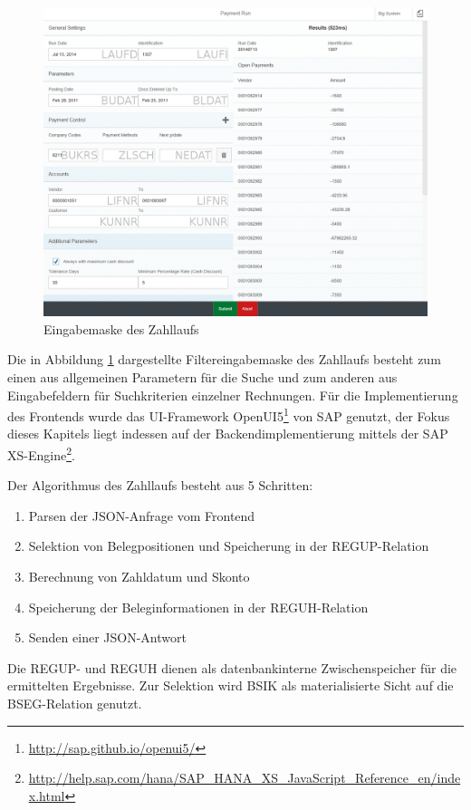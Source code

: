 \begin{figure}[ht]
	\centering
  \includegraphics[width=1\textwidth]{figures/paymentrun.png}
	\caption{Eingabemaske des Zahllaufs}
	\label{fig:paymentrun}
\end{figure}

Die in Abbildung \ref{fig:paymentrun} dargestellte Filtereingabemaske des Zahllaufs besteht zum einen aus allgemeinen Parametern für die Suche und zum anderen aus Eingabefeldern für Suchkriterien einzelner Rechnungen.
Für die Implementierung des Frontends wurde das UI-Framework OpenUI5\footnote{\url{http://sap.github.io/openui5/}} von SAP genutzt, der Fokus dieses Kapitels liegt indessen auf der Backendimplementierung mittels der SAP XS-Engine\footnote{\url{http://help.sap.com/hana/SAP_HANA_XS_JavaScript_Reference_en/index.html}}.

Der Algorithmus des Zahllaufs besteht aus 5 Schritten:
   \begin{enumerate}
      \item Parsen der JSON-Anfrage vom Frontend
			\item Selektion von Belegpositionen und Speicherung in der REGUP-Relation
			\item Berechnung von Zahldatum und Skonto
			\item Speicherung der Beleginformationen in der REGUH-Relation
			\item Senden einer JSON-Antwort
   \end{enumerate}

Die REGUP- und REGUH dienen als datenbankinterne Zwischenspeicher für die ermittelten Ergebnisse.
Zur Selektion wird BSIK als materialisierte Sicht auf die BSEG-Relation genutzt.

